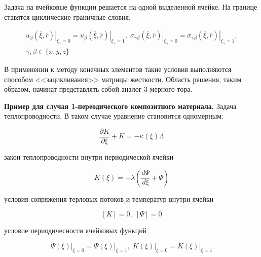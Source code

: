 Задача на ячейковые функции решается на одной выделенной ячейке. На границе ставятся циклические граничные словия:

\begin{equation}
    \label{elhp:eq14}
    \begin{gathered}
    u_{\beta} \left. \left( \overline{\xi}, \overline{r} \right)  \right|_{\xi_{\gamma}=0} =
    u_{\beta} \left. \left( \overline{\xi}, \overline{r} \right)  \right|_{\xi_{\gamma}=1} 
    ,\;
    \sigma_{\gamma\beta} \left. \left( \overline{\xi}, \overline{r} \right)  \right|_{\xi_{\gamma}=0} =
    \sigma_{\gamma\beta} \left. \left( \overline{\xi}, \overline{r} \right)  \right|_{\xi_{\gamma}=1} 
    ,
    \\
    \gamma,\beta \in \{x,y,z\} 
    \end{gathered}
\end{equation}

В применении к методу конечных элементов такие условия выполняются способом <<зацикливания>> матрицы жесткости.
Область решения, таким образом, начинат представлять собой аналог 3-мерного тора.

\textbf{Пример для случая 1-переодического композитного материала.} Задача теплопроводности. В таком случае уравнение становится одномерным:

\begin{equation}
    \frac{\partial K}{\partial \xi}+
    K=
    -\kappa \left(\xi \right) \Lambda^{}
    \label{equ:1d_beg}  
\end{equation}

закон теплопроводности внутри периодической ячейки

\begin{equation}
    K \left( \xi \right) = 
    - \lambda 
    \left( \frac{d\Psi}{d\xi} + \Psi\right)
\end{equation}

условия сопряжения терловых потоков и температур внутри ячейки

\begin{equation}
    \left[  K \right] = 0, \; \left[  \Psi\right] = 0
\end{equation}

условие периодичесности ячейковых функций

\begin{equation}
    \label{periodic_cell}
    \left. \Psi \left( \xi \right) \right|_{\xi=0} =
    \left. \Psi \left( \xi \right) \right|_{\xi=1}, \;
    \left. K \left( \xi \right) \right|_{\xi=0} =
    \left. K \left( \xi \right) \right|_{\xi=1}
\end{equation}

